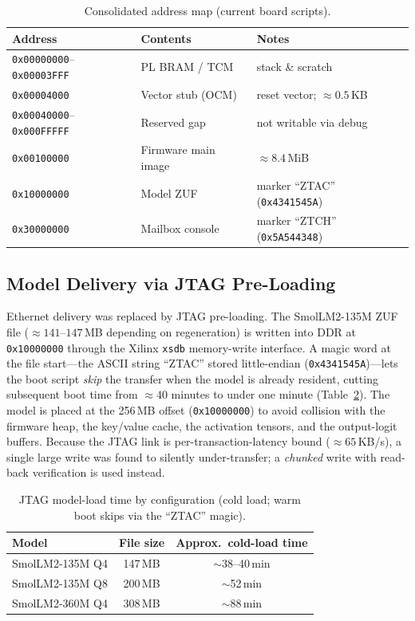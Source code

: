 \begin{table}[H]
\centering
\caption{Consolidated address map (current board scripts).}
\label{tab:p3-memmap}
\renewcommand{\arraystretch}{1.2}
\begin{tabular}{@{}lll@{}}
\toprule
\textbf{Address} & \textbf{Contents} & \textbf{Notes} \\
\midrule
\texttt{0x00000000}--\texttt{0x00003FFF} & PL BRAM / TCM   & stack \& scratch \\
\texttt{0x00004000}                      & Vector stub (OCM) & reset vector; $\approx 0.5$\,KB \\
\texttt{0x00040000}--\texttt{0x000FFFFF} & Reserved gap    & not writable via debug \\
\texttt{0x00100000}                      & Firmware main image & $\approx 8.4$\,MiB \\
\texttt{0x10000000}                      & Model ZUF       & marker ``ZTAC'' (\texttt{0x4341545A}) \\
\texttt{0x30000000}                      & Mailbox console & marker ``ZTCH'' (\texttt{0x5A544348}) \\
\bottomrule
\end{tabular}
\end{table}

\subsection{Model Delivery via JTAG Pre-Loading}

Ethernet delivery was replaced by JTAG pre-loading. The SmolLM2-135M ZUF file
($\approx 141$--$147$\,MB depending on regeneration) is written into DDR at \texttt{0x10000000}
through the Xilinx \texttt{xsdb} memory-write interface. A magic word at the file start---the ASCII
string ``ZTAC'' stored little-endian (\texttt{0x4341545A})---lets the boot script \emph{skip} the
transfer when the model is already resident, cutting subsequent boot time from $\approx 40$ minutes
to under one minute (Table~\ref{tab:p3-load}). The model is placed at the 256\,MB offset
(\texttt{0x10000000}) to avoid collision with the firmware heap, the key/value cache, the activation
tensors, and the output-logit buffers. Because the JTAG link is per-transaction-latency bound
($\approx 65$\,KB/s), a single large write was found to silently under-transfer; a \emph{chunked}
write with read-back verification is used instead.

\begin{table}[H]
\centering
\caption{JTAG model-load time by configuration (cold load; warm boot skips via the ``ZTAC'' magic).}
\label{tab:p3-load}
\renewcommand{\arraystretch}{1.2}
\begin{tabular}{@{}lcc@{}}
\toprule
\textbf{Model} & \textbf{File size} & \textbf{Approx.\ cold-load time} \\
\midrule
SmolLM2-135M Q4 & 147\,MB & $\sim$38--40\,min \\
SmolLM2-135M Q8 & 200\,MB & $\sim$52\,min \\
SmolLM2-360M Q4 & 308\,MB & $\sim$88\,min \\
\bottomrule
\end{tabular}
\end{table}

